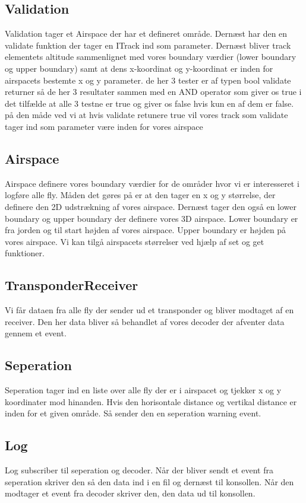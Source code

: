 \subsection{Validation}
Validation tager et Airspace der har et defineret område. Dernæst har den en validate funktion der tager en ITrack ind som parameter. Dernæst bliver track elementets altitude sammenlignet med vores boundary værdier (lower boundary og upper boundary) samt at dens x-koordinat og y-koordinat er inden for airspacets bestemte x og y parameter. de her 3 tester er af typen bool validate returner så de her 3 resultater sammen med en AND operator som giver os true i det tilfælde at alle 3 testne er true og giver os false hvis kun en af dem er false. på den måde ved vi at hvis validate retunere true vil vores track som validate tager ind som parameter være inden for vores airspace
\subsection{Airspace}
Airspace definere vores boundary værdier for de områder hvor vi er interesseret i logføre alle fly. Måden det gøres på er at den tager en x og y størrelse, der definere den 2D udstrækning af vores airspace. Dernæst tager den også en lower boundary og upper boundary der definere vores 3D airspace. Lower boundary er fra jorden og til start højden af vores airspace. Upper boundary er højden på vores airspace. Vi kan tilgå airspacets størrelser ved hjælp af set og get funktioner.
\subsection{TransponderReceiver}
Vi får dataen fra alle fly der sender ud et transponder og bliver modtaget af en receiver. Den her data bliver så behandlet af vores decoder der afventer data gennem et event.
\subsection{Seperation}
Seperation tager ind en liste over alle fly der er i airspacet og tjekker x og y koordinater mod hinanden. Hvis den horisontale distance og vertikal distance er inden for et given område. Så sender den en seperation warning event.
\subsection{Log}
Log subscriber til seperation og decoder. Når der bliver sendt et event fra seperation skriver den så den data ind i en fil og dernæst til konsollen. Når den modtager et event fra decoder skriver den, den data ud til konsollen. 
